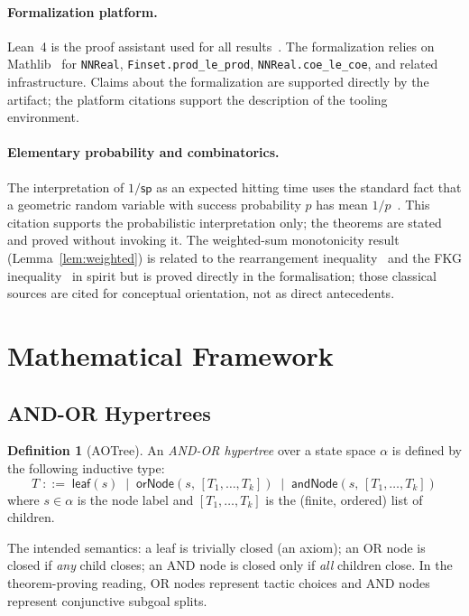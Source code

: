 \documentclass[reqno,11pt]{amsart}
\newcommand{\sP}{\mathsf{sp}}
\newcommand{\leafN}{\mathsf{leaf}}
\newcommand{\orN}{\mathsf{orNode}}
\newcommand{\andN}{\mathsf{andNode}}
\theoremstyle{plain}
\theoremstyle{definition}
\newtheorem{definition}[theorem]{Definition}
\theoremstyle{remark}
\begin{document}
\paragraph{Formalization platform.} Lean~4 is the proof assistant used for all results~\citep{deMouraUllrich2021}. The formalization relies on Mathlib~\citep{Mathlib2020} for \texttt{NNReal}, \texttt{Finset.prod\_le\_prod}, \texttt{NNReal.coe\_le\_coe}, and related infrastructure. Claims about the formalization are supported directly by the artifact; the platform citations support the description of the tooling environment.

\paragraph{Elementary probability and combinatorics.} The interpretation of $1/\sP$ as an expected hitting time uses the standard fact that a geometric random variable with success probability $p$ has mean $1/p$~\citep{Feller1968}. This citation supports the probabilistic interpretation only; the theorems are stated and proved without invoking it. The weighted-sum monotonicity result (Lemma~\ref{lem:weighted}) is related to the rearrangement inequality~\citep{HardyLittlewoodPolya1952} and the FKG inequality~\citep{FKG1971} in spirit but is proved directly in the formalisation; those classical sources are cited for conceptual orientation, not as direct antecedents.

\section{Mathematical Framework}

\subsection{AND-OR Hypertrees}

\begin{definition}[AOTree]
An \emph{AND-OR hypertree} over a state space $\alpha$ is defined by the following inductive type:
\[
T \;::=\; \leafN(s) \;\mid\; \orN(s,\,[T_1,\ldots,T_k]) \;\mid\; \andN(s,\,[T_1,\ldots,T_k])
\]
where $s \in \alpha$ is the node label and $[T_1,\ldots,T_k]$ is the (finite, ordered) list of children.
\end{definition}

The intended semantics: a leaf is trivially closed (an axiom); an OR node is closed if \emph{any} child closes; an AND node is closed only if \emph{all} children close. In the theorem-proving reading, OR nodes represent tactic choices and AND nodes represent conjunctive subgoal splits.
\end{document}

